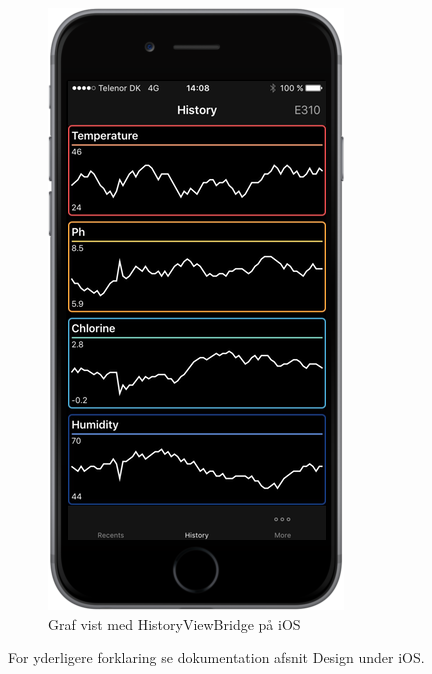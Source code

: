 \begin{figure}
\centering
\includegraphics[width=0.4\linewidth]{figs/implementering/ios_imp_historyview}
\caption{Graf vist med HistoryViewBridge på iOS}
\label{fig:ios_imp_historyview}
\end{figure}

For yderligere forklaring se dokumentation afsnit Design under iOS.